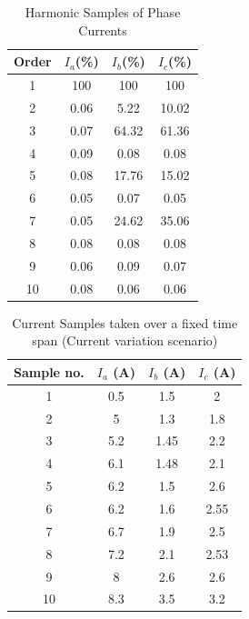 \documentclass[a4paper,12pt,oneside]{book}
\begin{document}
\begin{table}[ht]
  \centering
  \caption{Harmonic Samples of Phase Currents\cite{6563537}}
  \begin{tabular}{|c|c|c|c|}
  \hline
  \textbf{Order} & \textbf{$I_{a}$(\%)} & \textbf{$I_{b}$(\%)} & \textbf{$I_{c}$(\%)} \\
  \hline
  1 & 100 & 100 & 100 \\
  2 & 0.06 & 5.22 & 10.02 \\
  3 & 0.07 & 64.32 & 61.36 \\
  4 & 0.09 & 0.08 & 0.08 \\
  5 & 0.08 & 17.76 & 15.02 \\
  6 & 0.05 & 0.07 & 0.05 \\
  7 & 0.05 & 24.62 & 35.06 \\
  8 & 0.08 & 0.08 & 0.08 \\
  9 & 0.06 & 0.09 & 0.07 \\
  10 & 0.08 & 0.06 & 0.06 \\
  \hline
  \end{tabular}
  \label{tab:harmonic-samples-currents}
  \end{table}

\newpage
  \begin{table}[ht]
    \centering
    \caption{Current Samples taken over a fixed time span (Current variation scenario)\cite{THENTRAL20225370}}
    \begin{tabular}{|c|c|c|c|}
    \hline
    \textbf{Sample no.} & \textbf{$I_a$ (A)} & \textbf{$I_{b}$ (A)} & \textbf{$I_{c}$ (A)} \\
    \hline
    1 & 0.5 & 1.5 & 2 \\
    2 & 5 & 1.3 & 1.8 \\
    3 & 5.2 & 1.45 & 2.2 \\
    4 & 6.1 & 1.48 & 2.1 \\
    5 & 6.2 & 1.5 & 2.6 \\
    6 & 6.2 & 1.6 & 2.55 \\
    7 & 6.7 & 1.9 & 2.5 \\
    8 & 7.2 & 2.1 & 2.53 \\
    9 & 8 & 2.6 & 2.6 \\
    10 & 8.3 & 3.5 & 3.2 \\
    \hline
    \end{tabular}
    \label{tab:current-samples}
    \end{table}
\end{document}
